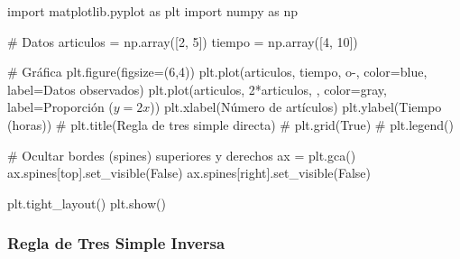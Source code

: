 \documentclass[
  stu,
  floatsintext,
  longtable,
  a4paper,
  nolmodern,
  notxfonts,
  notimes,
  12pt,
  colorlinks=true,linkcolor=blue,citecolor=blue,urlcolor=blue]{apa7}
\newenvironment{Shaded}{\begin{snugshade}}{\end{snugshade}}
\newcommand{\CommentTok}[1]{\textcolor[rgb]{0.37,0.37,0.37}{#1}}
\newcommand{\DecValTok}[1]{\textcolor[rgb]{0.68,0.00,0.00}{#1}}
\newcommand{\ImportTok}[1]{\textcolor[rgb]{0.00,0.46,0.62}{#1}}
\newcommand{\NormalTok}[1]{\textcolor[rgb]{0.00,0.23,0.31}{#1}}
\newcommand{\OperatorTok}[1]{\textcolor[rgb]{0.37,0.37,0.37}{#1}}
\newcommand{\StringTok}[1]{\textcolor[rgb]{0.13,0.47,0.30}{#1}}
\newcommand{\VariableTok}[1]{\textcolor[rgb]{0.07,0.07,0.07}{#1}}
\begin{document}
\begin{Shaded}
\begin{Highlighting}[]
\ImportTok{import}\NormalTok{ matplotlib.pyplot }\ImportTok{as}\NormalTok{ plt}
\ImportTok{import}\NormalTok{ numpy }\ImportTok{as}\NormalTok{ np}

\CommentTok{\# Datos}
\NormalTok{articulos }\OperatorTok{=}\NormalTok{ np.array([}\DecValTok{2}\NormalTok{, }\DecValTok{5}\NormalTok{])}
\NormalTok{tiempo }\OperatorTok{=}\NormalTok{ np.array([}\DecValTok{4}\NormalTok{, }\DecValTok{10}\NormalTok{])}

\CommentTok{\# Gráfica}
\NormalTok{plt.figure(figsize}\OperatorTok{=}\NormalTok{(}\DecValTok{6}\NormalTok{,}\DecValTok{4}\NormalTok{))}
\NormalTok{plt.plot(articulos, tiempo, }\StringTok{\textquotesingle{}o{-}\textquotesingle{}}\NormalTok{, color}\OperatorTok{=}\StringTok{\textquotesingle{}blue\textquotesingle{}}\NormalTok{, label}\OperatorTok{=}\StringTok{\textquotesingle{}Datos observados\textquotesingle{}}\NormalTok{)}
\NormalTok{plt.plot(articulos, }\DecValTok{2}\OperatorTok{*}\NormalTok{articulos, }\StringTok{\textquotesingle{}{-}{-}\textquotesingle{}}\NormalTok{, color}\OperatorTok{=}\StringTok{\textquotesingle{}gray\textquotesingle{}}\NormalTok{, label}\OperatorTok{=}\StringTok{\textquotesingle{}Proporción ($y = 2x$)\textquotesingle{}}\NormalTok{)}
\NormalTok{plt.xlabel(}\StringTok{\textquotesingle{}Número de artículos\textquotesingle{}}\NormalTok{)}
\NormalTok{plt.ylabel(}\StringTok{\textquotesingle{}Tiempo (horas)\textquotesingle{}}\NormalTok{)}
\CommentTok{\# plt.title(\textquotesingle{}Regla de tres simple directa\textquotesingle{})}
\CommentTok{\# plt.grid(True)}
\CommentTok{\# plt.legend()}

\CommentTok{\# Ocultar bordes (spines) superiores y derechos}
\NormalTok{ax }\OperatorTok{=}\NormalTok{ plt.gca()}
\NormalTok{ax.spines[}\StringTok{\textquotesingle{}top\textquotesingle{}}\NormalTok{].set\_visible(}\VariableTok{False}\NormalTok{)}
\NormalTok{ax.spines[}\StringTok{\textquotesingle{}right\textquotesingle{}}\NormalTok{].set\_visible(}\VariableTok{False}\NormalTok{)}

\NormalTok{plt.tight\_layout()}
\NormalTok{plt.show()}
\end{Highlighting}
\end{Shaded}

\subsubsection{Regla de Tres Simple
Inversa}\label{regla-de-tres-simple-inversa}
\end{document}
